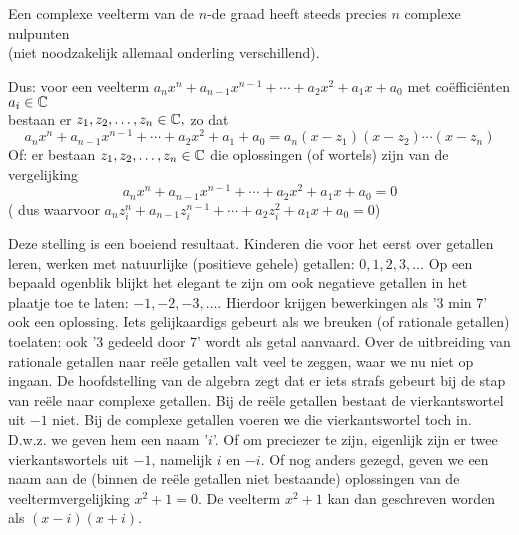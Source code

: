 \documentclass{ximera}
\begin{document}
	\author{Zomercursus KU Leuven}
	
	\label{xim:hoofdstelling_algebra}


\begin{proposition} \label{def:hoofdstelling}
	
	Een complexe veelterm van de $n$-de graad heeft steeds precies $n$ complexe nulpunten 
	\\ (niet noodzakelijk allemaal onderling verschillend).
	
	Dus: voor een veelterm $a_nx^n+a_{n-1}x^{n-1}+ \cdots +a_2x^2+a_1x+a_0$ met coëfficiënten $a_i\in \mathbb{C}$
	\\
	bestaan er $z_1,z_2,\ldots,z_n \in \mathbb{C},$ zo dat 
	$$
	a_nx^n+a_{n-1}x^{n-1}+ \cdots +a_2x^2+a_1+a_0=a_n(x-z_1)(x-z_2)\cdots (x-z_n)
	$$ 
	Of: er bestaan $z_1,z_2,\ldots,z_n \in\mathbb{C}$ die oplossingen (of wortels) zijn van de vergelijking
	$$
	a_nx^n+a_{n-1}x^{n-1}+ \cdots +a_2x^2+a_1x+a_0=0
	$$
	( dus waarvoor $a_nz_i^n+a_{n-1}z_i^{n-1}+ \cdots +a_2z_i^2+a_1x+a_0=0$)
\end{proposition}


Deze stelling is een boeiend resultaat.  Kinderen die voor het eerst
over getallen leren, werken met natuurlijke (positieve gehele)
getallen: $0,1,2,3,\ldots$ Op een bepaald ogenblik blijkt het elegant
te zijn om ook negatieve getallen in het plaatje toe te laten:
$-1,-2,-3,\ldots$. Hierdoor krijgen bewerkingen als  '$3$ min $7$' ook een oplossing.  Iets gelijkaardigs
gebeurt als we breuken (of rationale getallen) toelaten: ook '$3$
gedeeld door $7$' wordt als getal aanvaard. Over de uitbreiding van
rationale getallen naar re\"ele getallen valt veel te zeggen, waar we
nu niet op ingaan. De hoofdstelling van de algebra zegt dat er
iets strafs gebeurt bij de stap van re\"ele naar complexe getallen.
Bij de re\"ele getallen bestaat de vierkantswortel uit $-1$ niet. Bij
de complexe getallen voeren we die vierkantswortel toch in. D.w.z. we
geven hem een naam '$i$'. Of om preciezer te zijn, eigenlijk zijn er
twee vierkantswortels uit $-1$, namelijk $i$ en $-i$. Of nog anders
gezegd, geven we een naam aan de (binnen de re\"ele getallen niet
bestaande) oplossingen van de veeltermvergelijking $x^2+1=0$. De
veelterm $x^2+1$ kan dan geschreven worden als $(x-i)(x+i)$.
\end{document}
